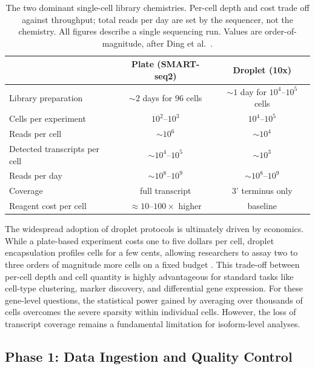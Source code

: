 \begin{table}[h]
\centering
\small
\setlength{\belowcaptionskip}{10pt}
\caption{The two dominant single-cell library chemistries. Per-cell depth and cost trade off against throughput; total reads per day are set by the sequencer, not the chemistry. All figures describe a single sequencing run. Values are order-of-magnitude, after Ding et al.\ \cite{ding2020systematic}.}\label{tab:protocols}
\begin{tabular}{lcc}
\toprule
 & \textbf{Plate (SMART-seq2)} & \textbf{Droplet (10x)} \\
\midrule
Library preparation & $\sim 2$ days for $96$ cells & $\sim 1$ day for $10^{4}$--$10^{5}$ cells \\
Cells per experiment & $10^{2}$--$10^{3}$ & $10^{4}$--$10^{5}$ \\
Reads per cell & $\sim 10^{6}$ & $\sim 10^{4}$ \\
Detected transcripts per cell & $\sim 10^{4}$--$10^{5}$ & $\sim 10^{3}$ \\
Reads per day & $\sim 10^{8}$--$10^{9}$ & $\sim 10^{8}$--$10^{9}$ \\
Coverage & full transcript & 3' terminus only \\
Reagent cost per cell & $\approx 10$--$100\times$ higher & baseline \\
\bottomrule
\end{tabular}
\end{table}

The widespread adoption of droplet protocols is ultimately driven by economics. While a plate-based experiment costs one to five dollars per cell, droplet encapsulation profiles cells for a few cents, allowing researchers to assay two to three orders of magnitude more cells on a fixed budget \cite{conte2024opportunities}. This trade-off between per-cell depth and cell quantity is highly advantageous for standard tasks like cell-type clustering, marker discovery, and differential gene expression. For these gene-level questions, the statistical power gained by averaging over thousands of cells overcomes the severe sparsity within individual cells. However, the loss of transcript coverage remains a fundamental limitation for \gls{isoform}-level analyses.

\subsection{Phase 1: Data Ingestion and Quality Control}

